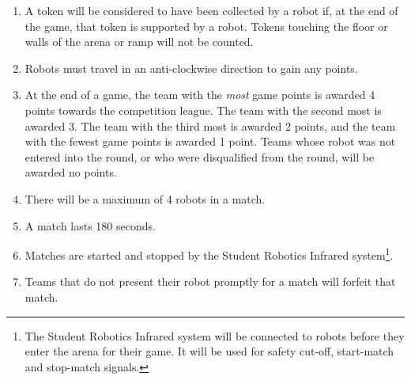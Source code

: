 \begin{enumerate}
\item A token will be considered to have been collected by a robot if, at the end of the game, that token is supported by a robot.
 Tokens touching the floor or walls of the arena or ramp will not be counted.

\item Robots must travel in an anti-clockwise direction to gain any points.

\item At the end of a game, the team with the \emph{most} game points is awarded 4 points towards the competition league.
 The team with the second most is awarded 3.
 The team with the third most is awarded 2 points, and the team with the fewest game points is awarded 1 point.
 Teams whose robot was not entered into the round, or who were disqualified from the round, will be awarded no points.

\item There will be a maximum of 4 robots in a match.
\item A match lasts 180 seconds.
\item Matches are started and stopped by the Student Robotics Infrared system\footnote{The Student Robotics Infrared system will be connected to robots before they enter the arena for their game.  It will be used for safety cut-off, start-match and stop-match signals.}.
\item Teams that do not present their robot promptly for a match will forfeit that match.
\end{enumerate}
